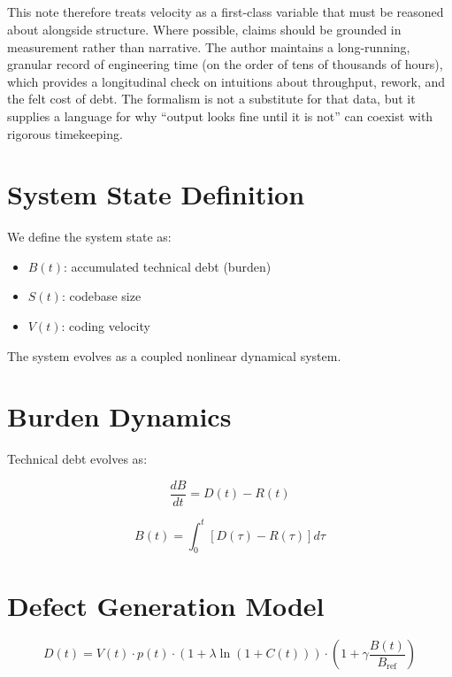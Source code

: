 \documentclass[11pt]{article}
\begin{document}
\subsection{}
This note therefore treats velocity as a first-class variable that must be reasoned about alongside structure. Where possible, claims should be grounded in measurement rather than narrative. The author maintains a long-running, granular record of engineering time (on the order of tens of thousands of hours), which provides a longitudinal check on intuitions about throughput, rework, and the felt cost of debt. The formalism is not a substitute for that data, but it supplies a language for why ``output looks fine until it is not'' can coexist with rigorous timekeeping.

\section{System State Definition}

We define the system state as:

\begin{itemize}
    \item $B(t)$: accumulated technical debt (burden)
    \item $S(t)$: codebase size
    \item $V(t)$: coding velocity
\end{itemize}

The system evolves as a coupled nonlinear dynamical system.

\section{Burden Dynamics}

Technical debt evolves as:

\begin{equation}
\frac{dB}{dt} = D(t) - R(t)
\end{equation}

\begin{equation}
B(t) = \int_0^t [D(\tau) - R(\tau)] d\tau
\end{equation}

\section{Defect Generation Model}

\begin{equation}
D(t) = V(t) \cdot p(t) \cdot \left(1 + \lambda \ln(1 + C(t))\right) \cdot \left(1 + \gamma \frac{B(t)}{B_{\text{ref}}}\right)
\end{equation}
\end{document}
